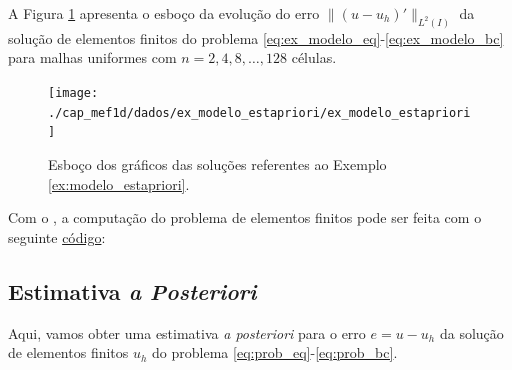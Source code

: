 \begin{ex}\label{ex:modelo_estapriori}
  A Figura \ref{fig:ex_modelo_estapriori} apresenta o esboço da evolução do erro $\|(u - u_h)'\|_{L^2(I)}$ da solução de elementos finitos do problema \eqref{eq:ex_modelo_eq}-\eqref{eq:ex_modelo_bc} para malhas uniformes com $n=2, 4, 8, \ldots, 128$ células.

\begin{figure}[h!]
  \centering
  \texttt{[image: ./cap\_mef1d/dados/ex\_modelo\_estapriori/ex\_modelo\_estapriori]}
  \caption{Esboço dos gráficos das soluções referentes ao Exemplo \ref{ex:modelo_estapriori}.}
  \label{fig:ex_modelo_estapriori}
\end{figure}

\ifispython
Com o \fenics, a computação do problema de elementos finitos pode ser feita com o seguinte \href{https://github.com/phkonzen/notas/blob/master/src/MetodoElementosFinitos/cap_mef1d/dados/ex_modelo_estapriori/ex_modelo_estapriori.py}{código}:

\fi
\end{ex}

\subsection{Estimativa \textit{a Posteriori}}
\badgeRevisar

Aqui, vamos obter uma estimativa \textit{a posteriori} para o erro $e = u - u_h$ da solução de elementos finitos $u_h$ do problema \eqref{eq:prob_eq}-\eqref{eq:prob_bc}.

